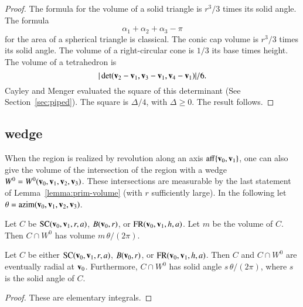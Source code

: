 \begin{proof}
The formula for the volume of a solid triangle is $r^3/3$ times
its solid angle.  The formula 
\begin{displaymath}\alpha_1+\alpha_2+\alpha_3-\pi\end{displaymath}
for the area of a spherical triangle is classical.    
The conic cap volume is
$r^3/3$ times its solid angle.  
The volume of a right-circular cone is $1/3$ its base times height.
The volume of a tetrahedron is
\begin{displaymath}
|\det({\mathbf v}_2-{\mathbf v}_1,{\mathbf v}_3-{\mathbf v}_1,{\mathbf v}_4-{\mathbf v}_1)|/6.
\end{displaymath}
Cayley and Menger evaluated the square of this determinant (See
Section~\ref{sec:piped}).  The square is $\Delta/4$, with
$\Delta\ge0$.  The result follows.
\end{proof}
%



\subsection{wedge}\label{sec:wedge}
%

When the region is realized by revolution along an axis
${\operatorname{aff}}\{{\mathbf v}_0,{\mathbf v}_1\}$, one can also give the volume of the
intersection of the region with a wedge
$W^0=W^0({\mathbf v}_0,{\mathbf v}_1,{\mathbf v}_2,{\mathbf v}_3)$.  These intersections are measurable by
the last statement of Lemma~\ref{lemma:prim-volume} (with $r$
sufficiently large).  In the following let $\theta =
{\operatorname{azim}}({\mathbf v}_0,{\mathbf v}_1,{\mathbf v}_2,{\mathbf v}_3)$.  %
%

\begin{lemma}  
Let $C$ be ${\operatorname{SC}}({\mathbf v}_0,{\mathbf v}_1,r,a)$, $B({\mathbf v}_0,r)$, or
${\operatorname{FR}}({\mathbf v}_0,{\mathbf v}_1,h,a)$.  Let $m$ be the volume of $C$.  Then
$C\cap W^0$ has volume $m\,\theta/(2\pi)$.
\end{lemma}
%

\begin{lemma}  
Let $C$ be either ${\operatorname{SC}}({\mathbf v}_0,{\mathbf v}_1,r,a)$, $B({\mathbf v}_0,r)$, or
${\operatorname{FR}}({\mathbf v}_0,{\mathbf v}_1,h,a)$.  Then $C$ and $C\cap W^0$ are eventually
radial at ${\mathbf v}_0$. Furthermore, $C\cap W^0$ has solid angle
$s\,\theta/(2\pi)$, where $s$ is the solid angle of $C$.
\end{lemma}


\begin{proof}
These are elementary integrals.
\end{proof}


